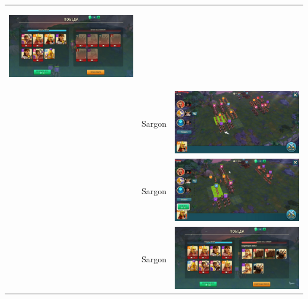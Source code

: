 \begin{longtable}{|c|c|c|}
    \hypertarget{fight39}{\includegraphics[width=0.75\linewidth]{./parts/media/TreasureHunt/39/sargon/photo_2022-04-07_13-18-31.jpg}} \\
    & Sargon &
    \includegraphics[width=0.75\linewidth]{./parts/media/TreasureHunt/39/sargon/photo_2022-04-07_13-18-09.jpg} \\
    & Sargon &
    \includegraphics[width=0.75\linewidth]{./parts/media/TreasureHunt/39/sargon/photo_2022-04-07_13-18-26.jpg} \\
    & Sargon &
    \includegraphics[width=0.75\linewidth]{./parts/media/TreasureHunt/39/sargon/photo_2022-04-07_13-18-21.jpg} \\

\end{longtable}
